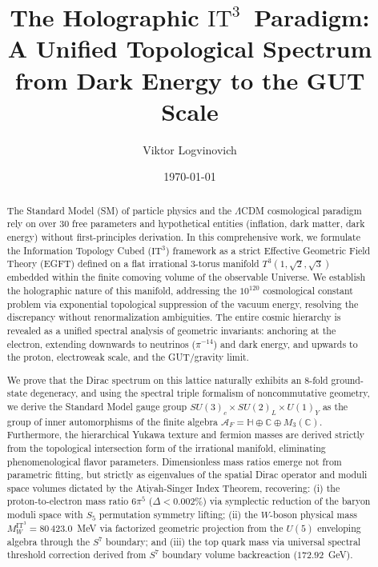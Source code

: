 \documentclass[onecolumn,aps,prd,superscriptaddress,nofootinbib,amsmath,amssymb]{revtex4-2}
\theoremstyle{definition}
\theoremstyle{remark}
\newcommand{\ITthree}{\ensuremath{\mathrm{IT}^3}}
\newcommand{\Tthree}{T^3(1,\sqrt{2},\sqrt{3})}
\begin{document}
\title{
The Holographic \ITthree\ Paradigm:\\
A Unified Topological Spectrum from Dark Energy to the GUT Scale
}

\author{Viktor Logvinovich}

\date{\today}

\begin{abstract}
The Standard Model (SM) of particle physics and the $\Lambda$CDM cosmological paradigm rely on over 30 free parameters and hypothetical entities (inflation, dark matter, dark energy) without first-principles derivation. In this comprehensive work, we formulate the Information Topology Cubed (\ITthree) framework as a strict Effective Geometric Field Theory (EGFT) defined on a flat irrational 3-torus manifold $\Tthree$ embedded within the finite comoving volume of the observable Universe. We establish the holographic nature of this manifold, addressing the $10^{120}$ cosmological constant problem via exponential topological suppression of the vacuum energy, resolving the discrepancy without renormalization ambiguities. The entire cosmic hierarchy is revealed as a unified spectral analysis of geometric invariants: anchoring at the electron, extending downwards to neutrinos ($\pi^{-14}$) and dark energy, and upwards to the proton, electroweak scale, and the GUT/gravity limit.

We prove that the Dirac spectrum on this lattice naturally exhibits an 8-fold ground-state degeneracy, and using the spectral triple formalism of noncommutative geometry, we derive the Standard Model gauge group $SU(3)_c \times SU(2)_L \times U(1)_Y$ as the group of inner automorphisms of the finite algebra $\mathcal{A}_F = \mathbb{H} \oplus \mathbb{C} \oplus M_3(\mathbb{C})$. Furthermore, the hierarchical Yukawa texture and fermion masses are derived strictly from the topological intersection form of the irrational manifold, eliminating phenomenological flavor parameters. Dimensionless mass ratios emerge not from parametric fitting, but strictly as eigenvalues of the spatial Dirac operator and moduli space volumes dictated by the Atiyah-Singer Index Theorem, recovering: (i) the proton-to-electron mass ratio $6\pi^5$ ($\Delta < 0.002\%$) via symplectic reduction of the baryon moduli space with $S_5$ permutation symmetry lifting; (ii) the $W$-boson physical mass $M_W^{\ITthree} = 80\,423.0$~MeV via factorized geometric projection from the $U(5)$ enveloping algebra through the $S^7$ boundary; and (iii) the top quark mass via universal spectral threshold correction derived from $S^7$ boundary volume backreaction ($172.92$~GeV).


\end{abstract}
\end{document}
